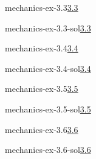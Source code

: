 \documentclass[preview]{standalone}
\begin{document}
\begin{snippetexercise}{mechanics-ex-3.3}{\underline{3.3}}
    \todo
\end{snippetexercise}

\begin{snippetsolution}{mechanics-ex-3.3-sol}{\underline{3.3}}
    \todo
\end{snippetsolution}

\begin{snippetexercise}{mechanics-ex-3.4}{\underline{3.4}}
    \todo
\end{snippetexercise}

\begin{snippetsolution}{mechanics-ex-3.4-sol}{\underline{3.4}}
    \todo
\end{snippetsolution}

\begin{snippetexercise}{mechanics-ex-3.5}{\underline{3.5}}
    \todo
\end{snippetexercise}

\begin{snippetsolution}{mechanics-ex-3.5-sol}{\underline{3.5}}
    \todo
\end{snippetsolution}

\begin{snippetexercise}{mechanics-ex-3.6}{\underline{3.6}}
    \todo
\end{snippetexercise}

\begin{snippetsolution}{mechanics-ex-3.6-sol}{\underline{3.6}}
    \todo
\end{snippetsolution}
\end{document}
